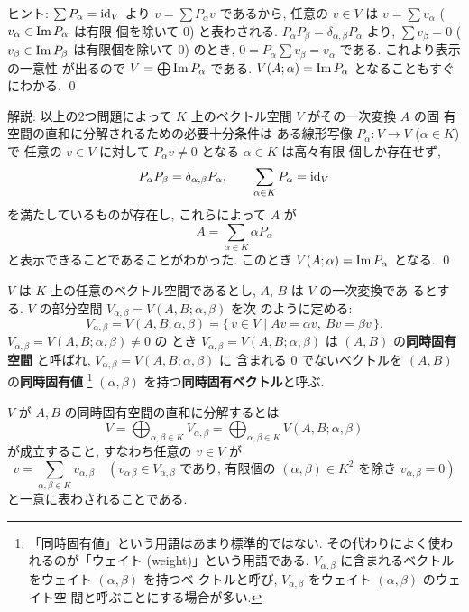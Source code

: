\documentclass[12pt,twoside]{jarticle}
\begin{document}
\noindent
ヒント: $\sum P_\alpha = \mathop{\mathrm{id}}\nolimits_V$ 
より $v = \sum P_\alpha v$ であるから, 
任意の $v\in V$ は $v = \sum v_\alpha$ ($v_\alpha\in\mathop{\mathrm{Im}}\nolimits P_\alpha$ は有限
個を除いて $0$) と表わされる. 
$P_\alpha P_{\beta} = \delta_{\alpha,\beta} P_\alpha$ 
より, $\sum v_\beta = 0$ ($v_\beta\in\mathop{\mathrm{Im}}\nolimits P_\beta$ は有限個を除いて $0$) 
のとき, $0 = P_\alpha\sum v_\beta = v_\alpha$ である.  これより表示の一意性
が出るので $V = \bigoplus\mathop{\mathrm{Im}}\nolimits P_\alpha$ である. 
$V(A;\alpha)=\mathop{\mathrm{Im}}\nolimits P_\alpha$ となることもすぐにわかる.
\qed

\medskip
\noindent
解説: 以上の2つ問題によって $K$ 上のベクトル空間 $V$ がその一次変換 $A$ の固
有空間の直和に分解されるための必要十分条件は
ある線形写像 $P_\alpha:V\to V$ ($\alpha\in K$) で
任意の $v\in V$ に対して $P_\alpha v\ne 0$ となる $\alpha\in K$ は高々有限
個しか存在せず, 
\begin{equation*}
  P_\alpha P_{\beta} = \delta_{\alpha,\beta} P_\alpha,
  \qquad
  \sum_{\alpha\in K} P_\alpha = \mathop{\mathrm{id}}\nolimits_V
\end{equation*}
を満たしているものが存在し, これらによって $A$ が
\begin{equation*}
  A = \sum_{\alpha\in K} \alpha P_\alpha
\end{equation*}
と表示できることであることがわかった.  
このとき $V(A;\alpha)=\mathop{\mathrm{Im}}\nolimits P_\alpha$ となる.
\qed

\bigskip

$V$ は $K$ 上の任意のベクトル空間であるとし, $A$, $B$ は $V$ の一次変換であ
るとする.  $V$ の部分空間 $V_{\alpha,\beta} = V(A,B;\alpha,\beta)$ を次
のように定める: 
\begin{equation*}
  V_{\alpha,\beta} = V(A,B;\alpha,\beta) =
  \{\, v\in V \mid Av=\alpha v,\ Bv=\beta v \,\}.
\end{equation*}
$V_{\alpha,\beta}=V(A,B;\alpha,\beta)\ne 0$ の
とき $V_{\alpha,\beta}=V(A,B;\alpha,\beta)$ 
は $(A,B)$ の{\bf 同時固有空間} と呼ばれ, 
$V_{\alpha,\beta}=V(A,B;\alpha,\beta)$ に
含まれる $0$ でないベクトルを $(A,B)$ の{\bf 同時固有値}%
\footnote{「同時固有値」という用語はあまり標準的ではない.
  その代わりによく使われるのが「ウェイト (weight)」という用語である.
  $V_{\alpha,\beta}$ に含まれるベクトルをウェイト $(\alpha,\beta)$ を持つベ
  クトルと呼び, $V_{\alpha,\beta}$ をウェイト $(\alpha,\beta)$ のウェイト空
  間と呼ぶことにする場合が多い.} %
$(\alpha,\beta)$ を持つ{\bf 同時固有ベクトル}と呼ぶ.

$V$ が $A,B$ の同時固有空間の直和に分解するとは
\begin{equation*}
  V
  = \bigoplus_{\alpha,\beta\in K} V_{\alpha,\beta}
  = \bigoplus_{\alpha,\beta\in K} V(A,B;\alpha,\beta)
\end{equation*}
が成立すること, すなわち任意の $v\in V$ が
\begin{equation*}
    v = \sum_{\alpha,\beta\in K} v_{\alpha,\beta}
    \quad
    (\text{$v_{\alpha\,\beta} \in V_{\alpha,\beta}$ であり, 
      有限個の $(\alpha,\beta)\in K^2$ を除き $v_{\alpha,\beta}=0$})
\end{equation*}
と一意に表わされることである.
\end{document}
